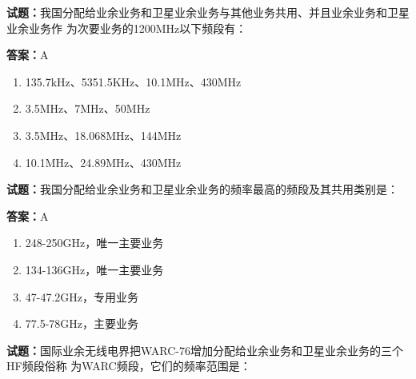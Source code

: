 \documentclass{ctexbook}
\begin{document}




\vspace{1em}

\textbf{试题：}我国分配给业余业务和卫星业余业务与其他业务共用、并且业余业务和卫星业余业务作
为次要业务的1200MHz以下频段有： 

\textbf{答案：}A 

\begin{enumerate}[leftmargin=3em]
  \item 135.7kHz、5351.5KHz、10.1MHz、430MHz 

  \item 3.5MHz、7MHz、50MHz 

  \item 3.5MHz、18.068MHz、144MHz 

  \item 10.1MHz、24.89MHz、430MHz 

\end{enumerate}





\vspace{1em}

\textbf{试题：}我国分配给业余业务和卫星业余业务的频率最高的频段及其共用类别是： 

\textbf{答案：}A 

\begin{enumerate}[leftmargin=3em]
  \item 248-250GHz，唯一主要业务 

  \item 134-136GHz，唯一主要业务 

  \item 47-47.2GHz，专用业务 

  \item 77.5-78GHz，主要业务 

\end{enumerate}






\vspace{1em}

\textbf{试题：}国际业余无线电界把WARC-76增加分配给业余业务和卫星业余业务的三个HF频段俗称
为WARC频段，它们的频率范围是： 
\end{document}
